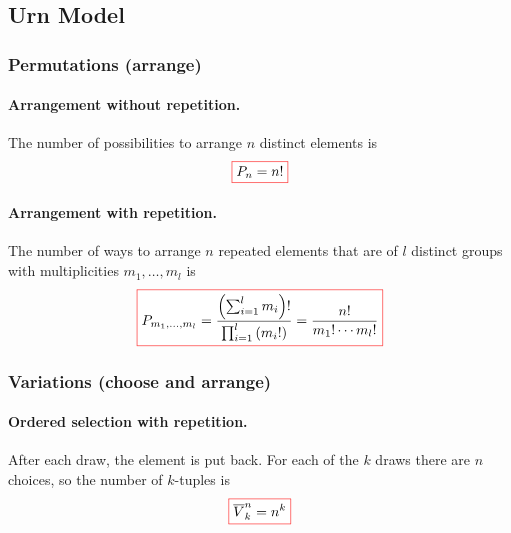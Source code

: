 \subsection{Urn Model}
\label{subsec:urn_models}



\subsubsection{Permutations (arrange)}
\paragraph{Arrangement without repetition.} \label{par:permutations_without_repetition}
The number of possibilities to arrange $n$ distinct elements is
\begin{equation}\label{eq:permutations_without_repetition}
  \fcolorbox{red}{white}{$\displaystyle
  P_n
  =
  n!
  $}
\end{equation}

\paragraph{Arrangement with repetition.}\label{par:permutations_with_repetition}
The number of ways to arrange $n$ repeated elements that are of $l$ distinct groups with multiplicities $m_1, \ldots, m_l$ is
\begin{equation}\label{eq:permutations_with_repetition}
  \fcolorbox{red}{white}{$\displaystyle
  P_{m_1, \ldots, m_l}
  =
  \frac{\left(\sum_{i=1}^l m_i\right)!}{\prod_{i=1}^l \left(m_i!\right)}
  =
  \frac{n!}{m_1! \cdots m_l!}
  $}
\end{equation}



\subsubsection{Variations (choose and arrange)}

\paragraph{Ordered selection with repetition.} \label{par:variations_with_repetition}
After each draw, the element is put back.
For each of the $k$ draws there are $n$ choices, so the number of $k$-tuples is
\begin{equation}\label{eq:variations_with_repetition}
  \fcolorbox{red}{white}{$\displaystyle
  \overline{V}^n_k
  =
  n^k
  $}
\end{equation}

